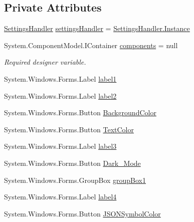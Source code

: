 \subsection*{Private Attributes}
\begin{DoxyCompactItemize}
\item 
\mbox{\hyperlink{class_cert_complete_1_1_settings_handler}{Settings\+Handler}} \mbox{\hyperlink{class_cert_complete_1_1_preferences_a4cc7f09d6878e757d8237310ca1cb8f6}{settings\+Handler}} = \mbox{\hyperlink{class_cert_complete_1_1_settings_handler_a7c4f8eb33b1113986d52942f93e52da8}{Settings\+Handler.\+Instance}}
\item 
System.\+Component\+Model.\+I\+Container \mbox{\hyperlink{class_cert_complete_1_1_preferences_a483d1e7aa63cd73f33a27104e5ec4c3c}{components}} = null
\begin{DoxyCompactList}\small\item\em Required designer variable. \end{DoxyCompactList}\item 
System.\+Windows.\+Forms.\+Label \mbox{\hyperlink{class_cert_complete_1_1_preferences_a5a1e5270cd4ef66904d2d5c20d561be5}{label1}}
\item 
System.\+Windows.\+Forms.\+Label \mbox{\hyperlink{class_cert_complete_1_1_preferences_a1ef64fd61327dac4f800fcb466069bcf}{label2}}
\item 
System.\+Windows.\+Forms.\+Button \mbox{\hyperlink{class_cert_complete_1_1_preferences_a251901d49a76fa302cb4cdd44c3434d2}{Background\+Color}}
\item 
System.\+Windows.\+Forms.\+Button \mbox{\hyperlink{class_cert_complete_1_1_preferences_a3f12547699fa6359fe413d8d7ea178f4}{Text\+Color}}
\item 
System.\+Windows.\+Forms.\+Label \mbox{\hyperlink{class_cert_complete_1_1_preferences_a6b04875be8b9fee7ce05322ef51bde4e}{label3}}
\item 
System.\+Windows.\+Forms.\+Button \mbox{\hyperlink{class_cert_complete_1_1_preferences_ad6dfced2a63f41bf9835daf8449cc2fb}{Dark\+\_\+\+Mode}}
\item 
System.\+Windows.\+Forms.\+Group\+Box \mbox{\hyperlink{class_cert_complete_1_1_preferences_ac29122ea465987ff051b3371174015c5}{group\+Box1}}
\item 
System.\+Windows.\+Forms.\+Label \mbox{\hyperlink{class_cert_complete_1_1_preferences_ab18a4cb4d9ff7356f3dc560a25ff6ae1}{label4}}
\item 
System.\+Windows.\+Forms.\+Button \mbox{\hyperlink{class_cert_complete_1_1_preferences_a4a028f3ee95cee390aa39ab5ef18b5d6}{J\+S\+O\+N\+Symbol\+Color}}

\end{DoxyCompactItemize}
